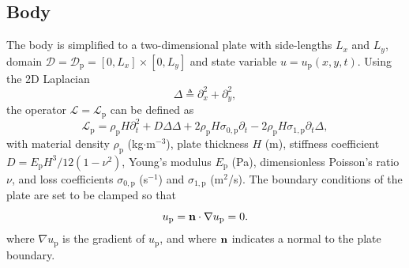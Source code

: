 \documentclass[dvipsnames, pdftex]{article}
\begin{document}
\subsection{Body}
The body is simplified to a two-dimensional plate with side-lengths $L_x$ and $L_y$, domain $\mathcal{D} = \mathcal{D}_\text{p} = [0,L_x] \times [0,L_y]$ and state variable $u = u_\text{p}(x,y,t)$. Using the 2D Laplacian
\begin{equation}
    \Delta \triangleq \partial_x^2+\partial_y^2,
\end{equation}
the operator $\mathcal{L} = \mathcal{L}_\text{p}$ can be defined as
\begin{equation}
    \mathcal{L}_\text{p} = \rho_\text{p}H\partial_t^2 + D\Delta\Delta +2\rho_\text{p}H\sigma_{0,\text{p}}\partial_t-2\rho_\text{p}H\sigma_{1,\text{p}}\partial_t\Delta,
\end{equation}
with material density $\rho_\text{p}$ (kg$\cdot$m$^{-3}$), plate thickness $H$ (m), stiffness coefficient $D = E_\text{p}H^3/12(1-\nu^2)$, Young's modulus $E_\text{p}$ (Pa), dimensionless Poisson's ratio $\nu$, and loss coefficients $\sigma_{0,\text{p}}$ (s$^{-1}$) and $\sigma_{1,\text{p}}$ (m$^2$/s). The boundary conditions of the plate are set to be clamped so that
\begin{equation}
    u_\text{p} = {\bf n} \cdot \nabla u_\text{p} = 0.
\end{equation}
where $\nabla u_\text{p}$ is the gradient of $u_\text{p}$, and where ${\bf n}$ indicates a normal to the plate boundary.
\end{document}
